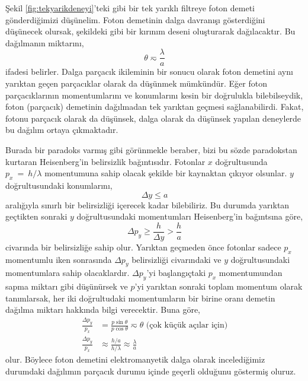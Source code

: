 \documentclass[00_kitap.tex]{subfiles}
\begin{document}
Şekil \ref{fig:tekyarikdeneyi}'teki gibi bir tek yarıklı filtreye foton demeti gönderdiğimizi düşünelim. Foton demetinin dalga davranışı gösterdiğini düşünecek olursak, şekildeki gibi bir kırınım deseni oluşturarak dağılacaktır. Bu dağılmanın miktarını,
\begin{equation*}
\theta \eqsim \frac{\lambda}{a}
\end{equation*}
ifadesi belirler. Dalga parçacık ikileminin bir sonucu olarak foton demetini aynı yarıktan geçen parçacıklar olarak da düşünmek mümkündür. Eğer foton parçacıklarının momentumlarını ve konumlarını kesin bir doğrulukla bilebilseydik, foton (parçacık) demetinin dağılmadan tek yarıktan geçmesi sağlanabilirdi. Fakat, fotonu parçacık olarak da düşünsek, dalga olarak da düşünsek yapılan deneylerde bu dağılım ortaya çıkmaktadır. 

Burada bir paradoks varmış gibi görünmekle beraber, bizi bu sözde paradokstan kurtaran Heisenberg'in belirsizlik bağıntısıdır. Fotonlar $x$ doğrultusunda $p_x~=~h/\lambda$ momentumuna sahip olacak şekilde bir kaynaktan çıkıyor olsunlar. $y$ doğrultusundaki konumlarını,
\begin{equation*}
\Delta y \leq a
\end{equation*}
aralığıyla sınırlı bir belirsizliği içerecek kadar bilebiliriz. Bu durumda yarıktan geçtikten sonraki $y$ doğrultusundaki momentumları Heisenberg'in bağıntsına göre,
\begin{equation*}
\Delta p_y \geq \frac{h}{\Delta y}>\frac{h}{a}
\end{equation*}
civarında bir belirsizliğe sahip olur. Yarıktan geçmeden önce fotonlar sadece $p_x$ momentumlu iken sonrasında $\Delta p_y$ belirsizliği civarındaki ve $y$ doğrultusundaki momentumlara sahip olacaklardır.
$\Delta p_y$'yi başlangıçtaki $p_x$ momentumundan sapma miktarı gibi düşünürsek ve $p$'yi yarıktan sonraki toplam momentum olarak tanımlarsak, her iki doğrultudaki momentumların bir birine oranı demetin dağılma miktarı hakkında bilgi verecektir. Buna göre,
\begin{align}
\frac{\Delta p_y}{p_x} &= \frac{p \sin\theta}{p \cos\theta}\eqsim\theta \text{ (çok küçük açılar için)}\\
\frac{\Delta p_y}{p_x} &\approx \frac { h / a } { h / \lambda } \approx \frac { \lambda } { a }
\end{align}
olur. Böylece foton demetini elektromanyetik dalga olarak incelediğimiz durumdaki dağılımın parçacık durumu içinde geçerli olduğunu göstermiş oluruz.
\end{document}
